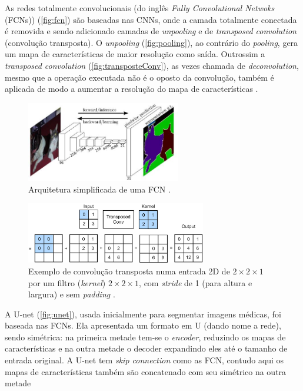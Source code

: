 \documentclass[12pt, a4paper, english, brazil]{article}
\begin{document}
As redes totalmente convolucionais (do inglês \textit{Fully Convolutional Netwoks} (FCNs)) (\autoref{fig:fcn}) são baseadas nas CNNs, onde a camada totalmente conectada é removida e sendo adicionado camadas de \textit{unpooling} e de \textit{transposed convolution} (convolução transposta).
O \textit{unpooling} (\autoref{fig:pooling}), ao contrário do \textit{pooling}, gera um mapa de características de maior resolução como saída. Outrossim a \textit{transposed convolution} (\autoref{fig:transposteConv}), as vezes chamada de \textit{deconvolution}, mesmo que a operação executada não é o oposto da convolução, também é aplicada de modo a aumentar a resolução do mapa de características \cite{Long_2015, Fang_2017}. 
\begin{figure}[htbp]
    \centering
    \includegraphics[width=0.6\textwidth]{img/fcn.jpg}
    \caption{Arquitetura simplificada de uma FCN \cite{Long_2015}.}
    \label{fig:fcn}
\end{figure}

\begin{figure}[htbp]
    \centering
    \includegraphics[width=0.7\textwidth]{img/trans_conv.jpg}
    \caption{Exemplo de convolução transposta numa entrada 2D de $2\times2\times1$ por um filtro (\textit{kernel}) $2\times2\times1$, com \textit{stride} de 1 (para altura e largura) e sem \textit{padding} \cite{Zhang_2021}.}
    \label{fig:transposteConv}
\end{figure}

A U-net (\autoref{fig:unet}), usada inicialmente para segmentar imagens médicas, foi baseada nas FCNs. Ela apresentada um formato em U (dando nome a rede), sendo simétrica: na primeira metade tem-se o \textit{encoder}, reduzindo os mapas de características e na outra metade o decoder expandindo eles até o tamanho de entrada original. A U-net tem \textit{skip connection} como as FCN, contudo aqui os mapas de características também são concatenado com seu simétrico na outra metade \cite{Ronneberge_2015, Hao_2020}
\end{document}
